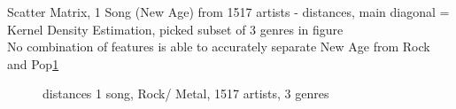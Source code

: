\noindent Scatter Matrix, 1 Song (New Age) from 1517 artists - distances, main diagonal = Kernel Density Estimation, picked subset of 3 genres in figure\\
No combination of features is able to accurately separate New Age from Rock and Pop\ref{fig:corr6}
\begin{figure}[htbp]
	\centering
	\caption{distances 1 song, Rock/ Metal, 1517 artists, 3 genres}
	\label{fig:corr6}
\end{figure}
\FloatBarrier


